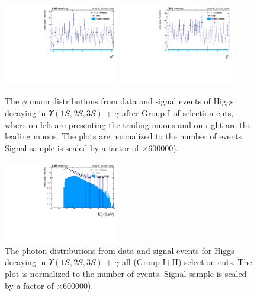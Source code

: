\begin{figure}[!htbp]
\begin{center}
\includegraphics[width=0.45\textwidth]{figures_and_tables/outputPlots/HtoUpsilon_Cat0_ZZZZZ/nEvts/data_x_mc/withKinCuts/h_withKin_TrailingMu_phi}\hspace*{1.cm}
\includegraphics[width=0.45\textwidth]{figures_and_tables/outputPlots/HtoUpsilon_Cat0_ZZZZZ/nEvts/data_x_mc/withKinCuts/h_withKin_LeadingMu_phi}
\end{center}\vspace*{-.5cm}
\caption{The $\phi$ muon distributions from data and signal events of Higgs decaying in $\Upsilon(1S,2S,3S)$ + $\gamma$ after Group I of selection cuts, where on left are presenting the trailing muons and on right are the leading muons. The plots are normalized to the number of events. Signal sample is scaled by a factor of $\times 600000$).}
\label{fig:phiMuons_HtoUpsilon_Cat0_groupI_plus_II}
\end{figure}


\begin{figure}[!htbp]
\begin{center}
\includegraphics[width=0.45\textwidth]{figures_and_tables/outputPlots/HtoUpsilon_Cat0_ZZZZZ/nEvts/data_x_mc/withKinCuts/h_withKin_Photon_pt}\hspace*{1.cm}
\end{center}\vspace*{-.5cm}
\caption{The \PT photon distributions from data and signal events for Higgs decaying in $\Upsilon(1S,2S,3S)$ + $\gamma$ all (Group I+II) selection cuts. The plot is normalized to the number of events. Signal sample is scaled by a factor of $\times 600000$).}
\label{fig:pTPhoton_HtoUpsilon_Cat0_groupI_plus_II}
\end{figure}


